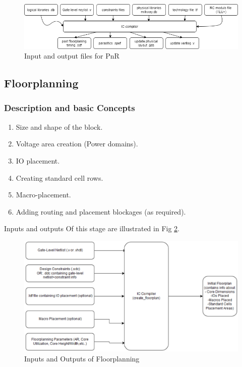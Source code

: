 \documentclass[../main.tex]{subfiles}
\begin{document}
\begin{figure}[h]
\centering
\includegraphics[width=15cm]{diagrams/IO_IC.png}
\caption{ Input and output files for PnR}
\label{fig:IO_IC}
\end{figure}
\subsection{Floorplanning} 
\subsubsection{Description and basic Concepts}
\begin{enumerate}
\item Size and shape of the block.
\item Voltage area creation (Power domains).
\item IO placement.
\item Creating standard cell rows.
\item Macro-placement.
\item Adding routing and placement blockages (as required).
\end{enumerate}

Inputs and outputs Of this stage are illustrated in Fig \ref{fig:IO_floorplaning}.

\begin{figure}[h]
\centering
\includegraphics[width=12cm]{diagrams/IO_floorplaning.PNG}
\caption{ Inputs and Outputs of Floorplanning}
\label{fig:IO_floorplaning}
\end{figure}
\end{document}
